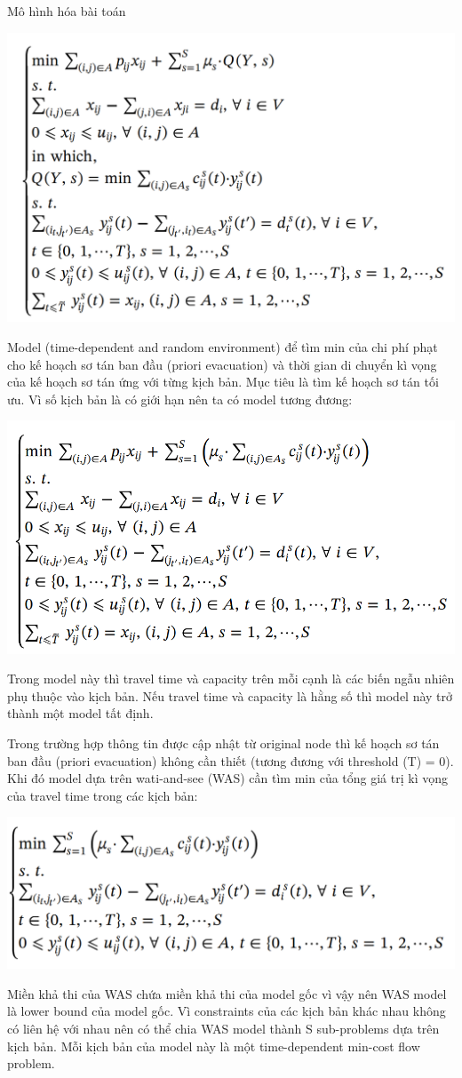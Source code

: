 \documentclass[a4paper]{article}
\begin{document}
{Mô hình hóa bài toán}
\begin{center}   
    \includegraphics[width=0.5\linewidth]{image.png}  
\end{center}

{Model (time-dependent and random environment) để tìm min của chi phí phạt cho kế hoạch sơ tán ban đầu (priori evacuation) và thời gian di chuyển kì vọng của kế hoạch sơ tán ứng với từng kịch bản. Mục tiêu là tìm kế hoạch sơ tán tối ưu. Vì số kịch bản là có giới hạn nên ta có model tương đương:}

    \begin{center}
      \includegraphics[width=0.5\linewidth]{image1.png}  
    \end{center}

{Trong model này thì travel time và capacity trên mỗi cạnh là các biến ngẫu nhiên phụ thuộc vào kịch bản. Nếu travel time và capacity là hằng số thì model này trở thành một model tất định.}

  {Trong trường hợp thông tin được cập nhật từ original node thì kế hoạch sơ tán ban đầu (priori evacuation) không cần thiết (tương đương với threshold (T) = 0). Khi đó model dựa trên wati-and-see (WAS) cần tìm min của tổng giá trị kì vọng của travel time trong các kịch bản:}  
\begin{center}  
    \includegraphics[width=0.5\linewidth]{image2.png}
\end{center}

{Miền khả thi của WAS chứa miền khả thi của model gốc vì vậy nên WAS model là lower bound của model gốc. Vì constraints của các kịch bản khác nhau không có liên hệ với nhau nên có thể chia WAS model thành S sub-problems dựa trên kịch bản. Mỗi kịch bản của model này là một time-dependent min-cost flow problem.}\\
\end{document}
